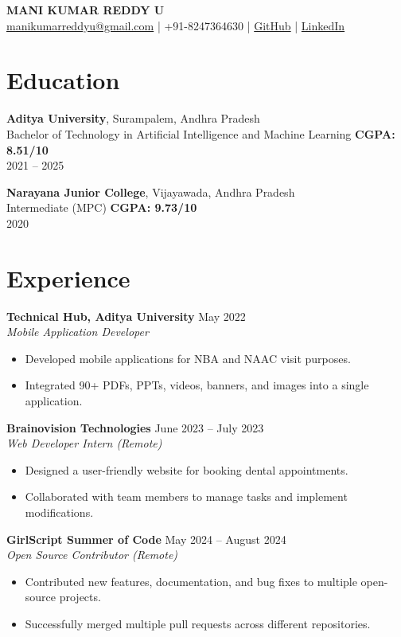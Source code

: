\documentclass[11pt,a4paper]{article}
\begin{document}
\begin{center}
    {\LARGE \textbf{MANI KUMAR REDDY U}}\\
    \vspace{2mm}
    \href{mailto:manikumarreddyu@gmail.com}{manikumarreddyu@gmail.com} \;|\;
    +91-8247364630 \;|\;
    \href{https://github.com/manikumarreddyu}{GitHub} \;|\;
    \href{https://linkedin.com/in/manikumarreddyu}{LinkedIn}
\end{center}

\section{Education}
\textbf{Aditya University}, Surampalem, Andhra Pradesh\\
Bachelor of Technology in Artificial Intelligence and Machine Learning \hfill \textbf{CGPA: 8.51/10}\\
2021 -- 2025

\vspace{2mm}
\textbf{Narayana Junior College}, Vijayawada, Andhra Pradesh\\
Intermediate (MPC) \hfill \textbf{CGPA: 9.73/10}\\
2020

\section{Experience}
\textbf{Technical Hub, Aditya University} \hfill May 2022\\
\textit{Mobile Application Developer}
\begin{itemize}
    \item Developed mobile applications for NBA and NAAC visit purposes.
    \item Integrated 90+ PDFs, PPTs, videos, banners, and images into a single application.
\end{itemize}

\textbf{Brainovision Technologies} \hfill June 2023 -- July 2023\\
\textit{Web Developer Intern (Remote)}
\begin{itemize}
    \item Designed a user-friendly website for booking dental appointments.
    \item Collaborated with team members to manage tasks and implement modifications.
\end{itemize}

\textbf{GirlScript Summer of Code} \hfill May 2024 -- August 2024\\
\textit{Open Source Contributor (Remote)}
\begin{itemize}
    \item Contributed new features, documentation, and bug fixes to multiple open-source projects.
    \item Successfully merged multiple pull requests across different repositories.
\end{itemize}
\end{document}
